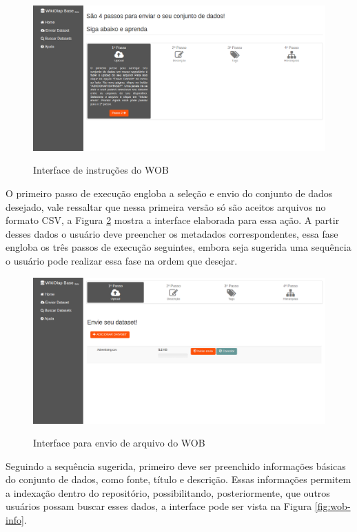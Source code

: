\begin{figure}[!htb]
    \centering
    \caption{Interface de instruções do WOB}
    \includegraphics[width=1\textwidth]{./04-figuras/wob-ajuda}
    \label{fig:wob-ajuda}
\end{figure}

O primeiro passo de execução engloba a seleção e envio do conjunto de dados desejado, vale
ressaltar que nessa primeira versão só são aceitos arquivos no formato CSV, a Figura \ref{fig:wob-sendfile} 
mostra a interface elaborada para essa ação. A partir desses dados o usuário deve preencher 
os metadados correspondentes, essa fase engloba os três passos de execução seguintes, embora 
seja sugerida uma sequência o usuário pode realizar essa fase na ordem que desejar. 

\begin{figure}[!htb]
    \centering
    \caption{Interface para envio de arquivo do WOB}
    \includegraphics[width=1\textwidth]{./04-figuras/wob-sendfile}
    \label{fig:wob-sendfile}
\end{figure}

Seguindo a sequência sugerida, primeiro deve ser preenchido informações básicas do conjunto 
de dados, como fonte, título e descrição. Essas informações permitem a indexação dentro do 
repositório, possibilitando, posteriormente, que outros usuários possam buscar esses dados, 
a interface pode ser vista na Figura \ref{fig:wob-info}. 

